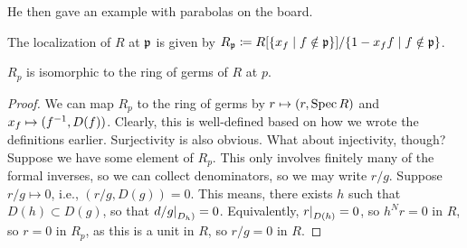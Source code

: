 {\color{airforceblue} He then gave an example with parabolas on the board.}

\newpage
\begin{definition} \label{defn:localization_at_prime_ideal}
    The localization of $R$ at $\mathfrak p$ is given by $R_\mathfrak p \coloneq R[\{x_f \mid f \notin \mathfrak p\}] / \{1 - x_f f \mid f \notin \mathfrak p\}$.
\end{definition}

\begin{theorem} \label{thm:localization_isomorphic_to_germ}
    $R_p$ is isomorphic to the ring of germs of $R$ at $p$.
\end{theorem}
\begin{proof}
    We can map $R_p$ to the ring of germs by $r \mapsto (r, \operatorname{Spec} R)$ and $x_f \mapsto (f^{-1}, D(f))$. Clearly, this is well-defined based on how we wrote the definitions earlier. Surjectivity is also obvious. What about injectivity, though? Suppose we have some element of $R_p$. This only involves finitely many of the formal inverses, so we can collect denominators, so we may write $r/g$. Suppose $r/g \mapsto 0$, i.e., $(r/g, D(g)) = 0$. This means, there exists $h$ such that $D(h) \subset D(g)$, so that $\restr{d/g}{D_h)} = 0$. Equivalently, $\restr{r}{D(h)} = 0$, so $h^N r = 0$ in $R$, so $r = 0$ in $R_p$, as this is a unit in $R$, so $r/g = 0$ in $R$.
\end{proof}

